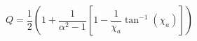 \begin{equation}
    Q = \frac{1}{2}\left(
        1 +  \frac{1}{\alpha^2 - 1}\left[1 - \frac{1}{\chi_a} \tan^{-1}\left(\chi_a\right)\right]
    \right)
    \label{eq:emt_q_oblate_spheroid}
\end{equation}
